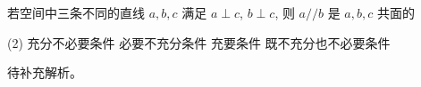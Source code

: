 \begin{choice}[source={2025合肥高三二检}, topic={线面共面与充要条件}]
若空间中三条不同的直线 $a, b, c$ 满足 $a \perp c$, $b \perp c$, 则 $a // b$ 是 $a, b, c$ 共面的
\begin{tasks}(2)
	\task 充分不必要条件
	\task 必要不充分条件
	\task 充要条件
	\task 既不充分也不必要条件
\end{tasks}
\end{choice}
\begin{choice-sol}
待补充解析。
\end{choice-sol}
